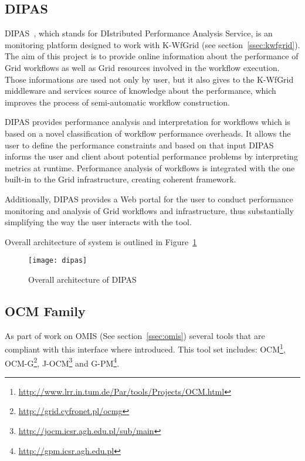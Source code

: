 \subsection{DIPAS}

DIPAS~\cite{DIPAS}, which stands for DIstributed Performance Analysis Service, is an monitoring platform
designed to work with K-WfGrid (see section~\ref{ssec:kwfgrid}). The aim of this project is to provide online
information about the performance of Grid workflows as well as Grid resources involved in the workflow
execution. Those informations are used not only by user, but it also gives to the K-WfGrid middleware and services
source of knowledge about the performance, which improves the process of semi-automatic workflow
construction.

DIPAS provides performance analysis and interpretation for workflows which is based on a novel classification of
workflow performance overheads. It allows the user to define the performance constraints and based on that
input DIPAS informs the user and client about potential performance problems by interpreting metrics at runtime.
Performance analysis of workflows is integrated with the one built-in to the Grid infrastructure, creating coherent
framework. 

Additionally, DIPAS provides a Web portal for the user to conduct performance monitoring and analysis of Grid workflows and infrastructure, thus substantially simplifying the way the user interacts with the tool.

Overall architecture of system is outlined in Figure~\ref{fig:dipas}

\begin{figure}[ht]
  \centering
  \texttt{[image: dipas]}
  \caption{Overall architecture of DIPAS}
  \label{fig:dipas}
\end{figure}

\subsection{OCM Family}

As part of work on OMIS (See section~\ref{ssec:omis}) several tools that are compliant with this interface where introduced. This tool set includes: OCM\footnote{\url{http://www.lrr.in.tum.de/Par/tools/Projects/OCM.html}}, OCM-G\footnote{\url{http://grid.cyfronet.pl/ocmg}}, J-OCM\footnote{\url{http://jocm.icsr.agh.edu.pl/sub/main}} and G-PM\footnote{\url{http://gpm.icsr.agh.edu.pl}}.

